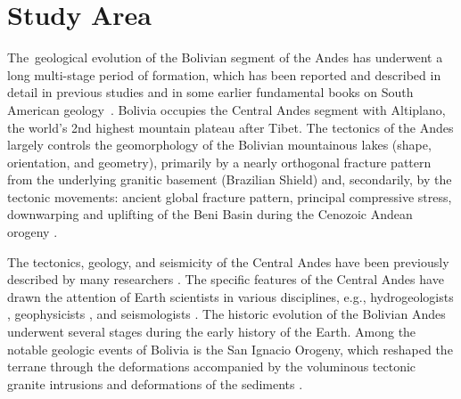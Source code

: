\documentclass[data,article,accept,pdftex,moreauthors]{Definitions/mdpi}
\begin{document}
\section{Study Area}


 \mbox{The geological} evolution of the Bolivian {segment of} the Andes has underwent a long multi-stage period of formation, which has been reported and described in detail in previous studies \cite{Andersonetal,Arguedas} and in some earlier fundamental books on South American \mbox{geology~\cite{Forbes,Suarez,Ahfeld}}. Bolivia occupies the Central Andes segment with Altiplano, the world's 2nd highest mountain plateau after Tibet. The tectonics of the Andes largely {controls} the geomorphology of the Bolivian mountainous lakes (shape, orientation, and geometry), primarily by a nearly orthogonal fracture pattern from the underlying granitic basement (Brazilian Shield) and, secondarily, by the tectonic movements: ancient global fracture pattern, principal compressive stress, downwarping and uplifting of the Beni Basin during the Cenozoic Andean orogeny \cite{Allenby1988}. 

The{ }tectonics{, }geology,{ and seismicity }of {the} Central Andes have been {previously} described by many researchers \cite{Ramos,Fernandez,Funning}. {The specific features of the Central Andes} have drawn the attention of Earth scientists in various disciplines, e.g.{, }hydrogeologists \cite{Lima2021a,Lima2021b}, geophysicists \cite{Aviles,Borsa}, and seismologists \cite{Dorbath,Dahm}. The historic evolution of the Bolivian Andes underwent several stages during the early history of the Earth. Among the notable geologic events of Bolivia {is} the San Ignacio Orogeny, which reshaped the terrane through {the} deformations accompanied by {the} voluminous tectonic granite {intrusions and deformations} of the sediments \cite{Boger}. 
\end{document}
